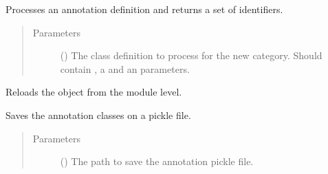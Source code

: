 \documentclass[letterpaper,10pt,english]{sphinxmanual}
\begin{document}
\begin{fulllineitems}
\begin{fulllineitems}
\end{fulllineitems}


\begin{fulllineitems}
\label{\detokenize{reference:pypath.annot.CustomAnnotation.process_annot}}
Processes an annotation definition and returns a set of
identifiers.
\begin{quote}\begin{description}
\item[{Parameters}] \leavevmode
{} () \textendash{} The class definition to process for the new category. Should
contain , a  and an 
parameters.

\end{description}\end{quote}

\end{fulllineitems}


\begin{fulllineitems}
\label{\detokenize{reference:pypath.annot.CustomAnnotation.reload}}
Reloads the object from the module level.

\end{fulllineitems}


\begin{fulllineitems}
\label{\detokenize{reference:pypath.annot.CustomAnnotation.save_to_pickle}}
Saves the annotation classes on a pickle file.
\begin{quote}\begin{description}
\item[{Parameters}] \leavevmode
{} () \textendash{} The path to save the annotation pickle file.

\end{description}\end{quote}

\end{fulllineitems}


\end{fulllineitems}
\end{document}
